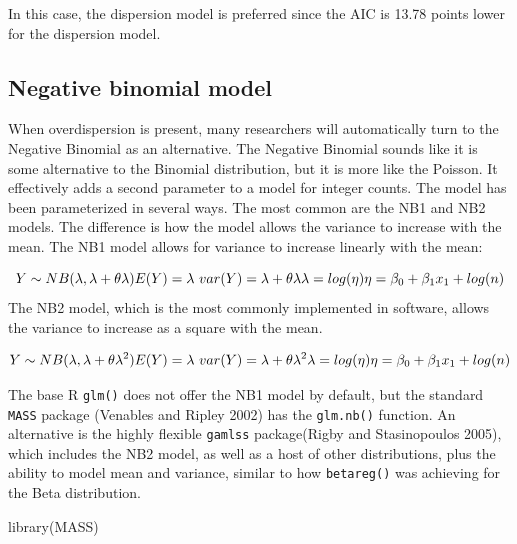 \documentclass[
  letterpaper,
  DIV=11,
  numbers=noendperiod]{scrreprt}
\newenvironment{Shaded}{\begin{snugshade}}{\end{snugshade}}
\newcommand{\FunctionTok}[1]{\textcolor[rgb]{0.28,0.35,0.67}{#1}}
\newcommand{\NormalTok}[1]{\textcolor[rgb]{0.00,0.23,0.31}{#1}}
\begin{document}
In this case, the dispersion model is preferred since the AIC is 13.78
points lower for the dispersion model.

\hypertarget{negative-binomial-model}{%
\subsection{Negative binomial model}\label{negative-binomial-model}}

When overdispersion is present, many researchers will automatically turn
to the Negative Binomial as an alternative. The Negative Binomial sounds
like it is some alternative to the Binomial distribution, but it is more
like the Poisson. It effectively adds a second parameter to a model for
integer counts. The model has been parameterized in several ways. The
most common are the NB1 and NB2 models. The difference is how the model
allows the variance to increase with the mean. The NB1 model allows for
variance to increase linearly with the mean:

\[
Y \sim NB (\lambda, \lambda+ \theta \lambda) \\
E(Y) = \lambda \\
\text{   } var(Y) = \lambda+\theta\lambda \\
\lambda = log(\eta) \\ 
\eta = \beta_0 + \beta_1 x_1+ log(n)
\] The NB2 model, which is the most commonly implemented in software,
allows the variance to increase as a square with the mean.

\[
Y \sim NB (\lambda, \lambda+ \theta \lambda^2) \\
E(Y) = \lambda \\
\text{   } var(Y) = \lambda+ \theta \lambda^2 \\
\lambda = log(\eta) \\ 
\eta = \beta_0 + \beta_1 x_1+ log(n)
\]

The base R \texttt{glm()} does not offer the NB1 model by default, but
the standard \texttt{MASS} package (Venables and Ripley 2002) has the
\texttt{glm.nb()} function. An alternative is the highly flexible
\texttt{gamlss} package(Rigby and Stasinopoulos 2005), which includes
the NB2 model, as well as a host of other distributions, plus the
ability to model mean and variance, similar to how \texttt{betareg()}
was achieving for the Beta distribution.

\begin{Shaded}
\begin{Highlighting}[]
\FunctionTok{library}\NormalTok{(MASS)}
\end{Highlighting}
\end{Shaded}
\end{document}

